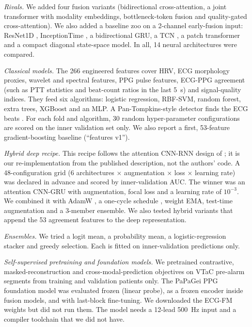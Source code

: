 \documentclass[conference]{IEEEtran}
\begin{document}
\emph{Rivals.} We added four fusion variants (bidirectional cross-attention, a joint transformer with modality embeddings, bottleneck-token fusion and quality-gated cross-attention). We also added a baseline zoo on a 2-channel early-fusion input: ResNet1D \cite{he2016resnet}, InceptionTime \cite{fawaz2020inceptiontime}, a bidirectional GRU, a TCN \cite{bai2018tcn}, a patch transformer and a compact diagonal state-space model. In all, 14 neural architectures were compared.

\emph{Classical models.} The 266 engineered features cover HRV, ECG morphology proxies, wavelet and spectral features, PPG pulse features, ECG-PPG agreement (such as PTT statistics and beat-count ratios in the last 5~s) and signal-quality indices. They feed six algorithms: logistic regression, RBF-SVM, random forest, extra trees, XGBoost \cite{chen2016xgboost} and an MLP. A Pan-Tompkins-style detector finds the ECG beats \cite{pantompkins1985}. For each fold and algorithm, 30 random hyper-parameter configurations are scored on the inner validation set only. We also report a first, 53-feature gradient-boosting baseline (``features v1'').

\emph{Hybrid deep recipe.} This recipe follows the attention CNN-RNN design of \cite{mousavi2020attention}; it is our re-implementation from the published description, not the authors' code. A 48-configuration grid (6 architectures $\times$ augmentation $\times$ loss $\times$ learning rate) was declared in advance and scored by inner-validation AUC. The winner was an attention CNN-GRU with augmentation, focal loss and a learning rate of $10^{-3}$. We combined it with AdamW \cite{loshchilov2019adamw}, a one-cycle schedule \cite{smith2019onecycle}, weight EMA, test-time augmentation and a 3-member ensemble. We also tested hybrid variants that append the 53 agreement features to the deep representation.

\emph{Ensembles.} We tried a logit mean, a probability mean, a logistic-regression stacker and greedy selection. Each is fitted on inner-validation predictions only.

\emph{Self-supervised pretraining and foundation models.} We pretrained contrastive, masked-reconstruction and cross-modal-prediction objectives on VTaC pre-alarm segments from training and validation patients only. The PaPaGei PPG foundation model \cite{pillai2025papagei} was evaluated frozen (linear probe), as a frozen encoder inside fusion models, and with last-block fine-tuning. We downloaded the ECG-FM weights \cite{mckeen2024ecgfm} but did not run them. The model needs a 12-lead 500~Hz input and a compiler toolchain that we did not have.
\end{document}
